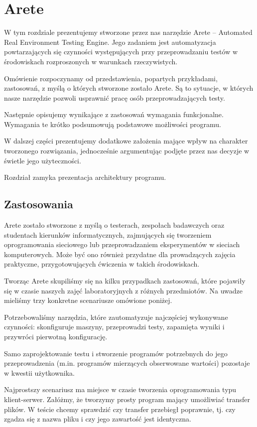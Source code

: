 \documentclass[00-praca-magisterska.tex]{subfiles}
\begin{document}
\chapter{Arete}
\label{arete}

W tym rozdziale prezentujemy stworzone przez nas narzędzie Arete -- Automated
Real Environment Testing Engine. Jego zadaniem jest automatyzacja
powtarzających się czynności występujących przy przeprowadzaniu testów w
środowiskach rozproszonych w warunkach rzeczywistych.

Omówienie rozpoczynamy od przedstawienia, popartych przykładami, zastosowań, z
myślą o których stworzone zostało Arete. Są to sytuacje, w których nasze
narzędzie pozwoli usprawnić pracę osób przeprowadzających testy.

Następnie opisujemy wynikające z zastosowań wymagania funkcjonalne. Wymagania
te krótko podsumowują podstawowe możliwości programu.

W dalszej części prezentujemy dodatkowe założenia mające wpływ na charakter
tworzonego rozwiązania, jednocześnie argumentując podjęte przez nas decyzje w
świetle jego użyteczności.

Rozdział zamyka prezentacja architektury programu.

\section{Zastosowania}
\label{arete-zastosowania}

Arete zostało stworzone z myślą o testerach, zespołach badawczych oraz
studentach kierunków informatycznych, zajmujących się tworzeniem oprogramowania
sieciowego lub przeprowadzaniem eksperymentów w sieciach komputerowych. Może być
ono również przydatne dla prowadzących zajęcia praktyczne, przygotowujących
ćwiczenia w takich środowiskach.

Tworząc Arete skupiliśmy się na kilku przypadkach zastosowań, które pojawiły
się w czasie naszych zajęć laboratoryjnych z różnych przedmiotów. Na uwadze
mieliśmy trzy konkretne scenariusze omówione poniżej.

Potrzebowaliśmy narzędzia, które zautomatyzuje najczęściej wykonywane
czynności: skonfiguruje maszyny, przeprowadzi testy, zapamięta wyniki i
przywróci pierwotną konfigurację.

Samo zaprojektowanie testu i stworzenie programów potrzebnych do jego
przeprowadzenia (m.in. programów mierzących obserwowane wartości) pozostaje w
kwestii użytkownika.

Najprostszy scenariusz ma miejsce w czasie tworzenia oprogramowania typu
klient-serwer. Załóżmy, że tworzymy prosty program mający umożliwiać transfer
plików. W teście chcemy sprawdzić czy transfer przebiegł poprawnie, tj. czy
zgadza się z nazwa pliku i czy jego zawartość jest identyczna.
\end{document}
